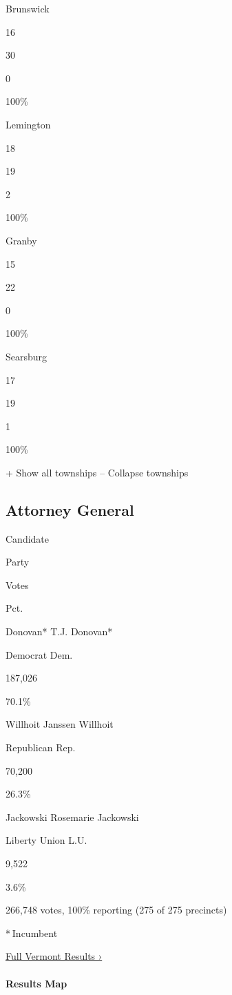 Brunswick

16

30

0

100\%

Lemington

18

19

2

100\%

Granby

15

22

0

100\%

Searsburg

17

19

1

100\%

+ Show all townships -- Collapse townships

\hypertarget{attorney-general}{%
\subsection{Attorney General}\label{attorney-general}}

Candidate

Party

Votes

Pct.

 Donovan* T.J. Donovan*

Democrat Dem.

187,026

70.1\%

 Willhoit Janssen Willhoit

Republican Rep.

70,200

26.3\%

 Jackowski Rosemarie Jackowski

Liberty Union L.U.

9,522

3.6\%

266,748 votes, 100\% reporting (275 of 275 precincts)

* Incumbent

\href{https://www.nytimes3xbfgragh.onion/interactive/2018/11/06/us/elections/results-vermont-elections.html}{Full
Vermont Results ›}

\hypertarget{results-map-4}{%
\paragraph{Results Map}\label{results-map-4}}

